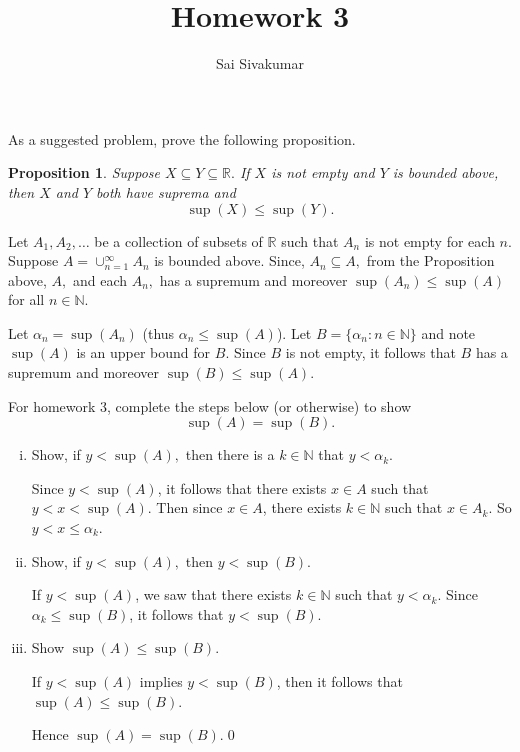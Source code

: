 \documentclass[12pt]{amsart}
\title{Homework 3}
\author{Sai Sivakumar}
\newtheorem{proposition}        [theorem]{Proposition}
\begin{document}
\maketitle

As a suggested problem, prove the following proposition.

\begin{proposition}
 Suppose $X\subseteq Y\subseteq \mathbb{R}.$ If $X$ is not empty and $Y$ is bounded
 above, then $X$ and $Y$ both have suprema and
\[
 \sup(X)\le \sup(Y).
\]
\end{proposition}


\bigskip


Let $A_1,A_2,\dots$ be a collection of subsets of $\mathbb{R}$  such that $A_n$
 is not  empty for each $n.$ Suppose $A=\cup_{n=1}^\infty A_n$ is bounded above. 
 Since, $A_n\subseteq A,$ 
 from the Proposition above,  $A,$ and each $A_n,$ has a supremum  and moreover
 $\sup(A_n)\le \sup(A)$ for all $n\in \mathbb{N}.$ 

 Let $\alpha_n=\sup(A_n)$ (thus $\alpha_n \le \sup(A)$).
  Let $B=\{\alpha_n: n\in \mathbb{N}\}$ and note $\sup(A)$ is an upper 
 bound for $B.$ Since $B$ is not empty,  it follows that $B$ has 
  a supremum and moreover $\sup(B)\le \sup(A).$

 For homework 3, 
 complete the steps below (or otherwise) to show
\[
 \sup(A)=\sup(B).
\]

\begin{enumerate}[(i)]
 \item  Show, if $y<\sup(A),$ then there is a $k\in\mathbb{N}$
 that $y<\alpha_k.$  %

 \vspace*{5pt}\noindent Since $y< \sup(A)$, it follows that there exists $x\in A$ such that $y<x< \sup(A)$. Then since $x\in A$, there exists $k\in\mathbb{N}$ such that $x\in A_k$. So $y < x \leq \alpha_k$.\vspace*{5pt}
 \item Show, if $y<\sup(A),$ then   $y<\sup(B).$
 
 \vspace*{5pt}\noindent If $y<\sup(A)$, we saw that there exists $k\in\mathbb{N}$ such that $y <\alpha_k$. Since $\alpha_k \leq \sup(B)$, it follows that $y < \sup(B)$.\vspace*{5pt}
 \item Show $\sup(A)\le \sup(B).$
 
 \vspace*{5pt}\noindent If $y<\sup(A)$ implies $y<\sup(B)$, then it follows that $\sup(A)\leq \sup(B)$. \vspace*{5pt}

 Hence $\sup(A) = \sup(B)$.\qed
\end{enumerate} 
\end{document}
